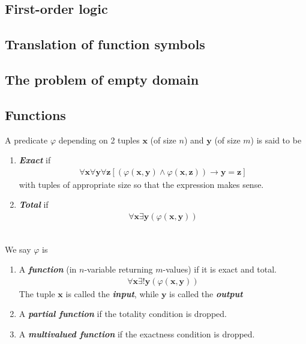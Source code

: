 \documentclass{treatise}
\begin{document}
\begin{shaded}
\newpage

\section{First-order logic}
\subsection{Translation of function symbols}
\subsection{The problem of empty domain}
\subsection{Functions}
A predicate $\varphi$ depending on 2 tuples $\mathbf{x}$ (of size $n$) and $\mathbf{y}$ (of size $m$) is said to be
\begin{enumerate}
    \item \textit{\textbf{Exact}} if
    \begin{gather*}
        \forall \mathbf{x} \forall \mathbf{y} \forall \mathbf{z} \left[ \left( \varphi(\mathbf{x}, \mathbf{y}) \wedge \varphi(\mathbf{x}, \mathbf{z}) \right) \rightarrow \mathbf{y} = \mathbf{z} \right]
    \end{gather*}
    with tuples of appropriate size so that the expression makes sense.
    \item \textit{\textbf{Total}} if
    \begin{gather*}
        \forall \mathbf{x} \exists \mathbf{y} (\varphi(\mathbf{x}, \mathbf{y}))
    \end{gather*}
\end{enumerate}
\ \\
We say $\varphi$ is
\begin{enumerate}
    \item A \textit{\textbf{function}} (in $n$-variable returning $m$-values) if it is exact and total.
    \begin{gather*}
        \forall \mathbf{x} \exists! \mathbf{y} (\varphi(\mathbf{x}, \mathbf{y}))
    \end{gather*}
    The tuple $\mathbf{x}$ is called the \textbf{\textit{input}}, while $\mathbf{y}$ is called the \textit{\textbf{output}}
    \item A \textit{\textbf{partial function}} if the totality condition is dropped.
    \item A \textit{\textbf{multivalued function}} if the exactness condition is dropped.

\end{enumerate}
\end{shaded}
\end{document}
